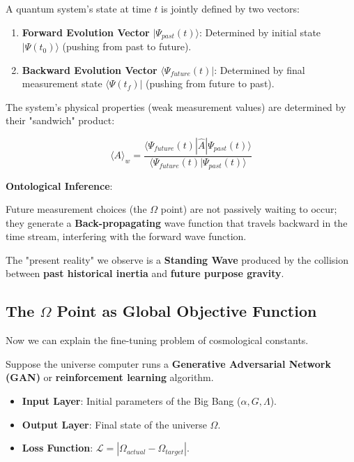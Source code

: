 A quantum system's state at time $t$ is jointly defined by two vectors:

\begin{enumerate}
\item \textbf{Forward Evolution Vector} $|\Psi_{past}(t)\rangle$: Determined by initial state $|\Psi(t_0)\rangle$ (pushing from past to future).

\item \textbf{Backward Evolution Vector} $\langle \Psi_{future}(t)|$: Determined by final measurement state $\langle \Psi(t_f)|$ (pushing from future to past).
\end{enumerate}

The system's physical properties (weak measurement values) are determined by their "sandwich" product:

\begin{equation}
\langle A \rangle_w = \frac{\langle \Psi_{future}(t) | \hat{A} | \Psi_{past}(t) \rangle}{\langle \Psi_{future}(t) | \Psi_{past}(t) \rangle}
\end{equation}

\textbf{Ontological Inference}:

Future measurement choices (the $\Omega$ point) are not passively waiting to occur; they generate a \textbf{Back-propagating} wave function that travels backward in the time stream, interfering with the forward wave function.

The "present reality" we observe is a \textbf{Standing Wave} produced by the collision between \textbf{past historical inertia} and \textbf{future purpose gravity}.

\subsection{The $\Omega$ Point as Global Objective Function}

Now we can explain the fine-tuning problem of cosmological constants.

Suppose the universe computer runs a \textbf{Generative Adversarial Network (GAN)} or \textbf{reinforcement learning} algorithm.

\begin{itemize}
\item \textbf{Input Layer}: Initial parameters of the Big Bang ($\alpha, G, \Lambda$).

\item \textbf{Output Layer}: Final state of the universe $\Omega$.

\item \textbf{Loss Function}: $\mathcal{L} = |\Omega_{actual} - \Omega_{target}|$.
\end{itemize}

